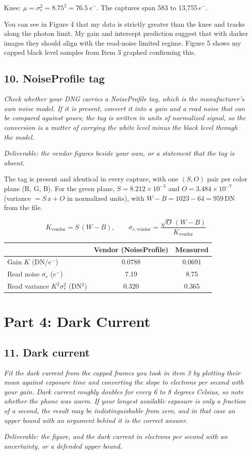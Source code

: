 \documentclass[11pt]{article}
\newcommand{\task}[3]{\subsection*{#1}{\sloppy\noindent\textit{#2}\par}\smallskip\noindent\textit{Deliverable: #3}\par\medskip}
\begin{document}
\noindent Knee: $\mu = \sigma_r^2 = 8.75^2 = 76.5\ e^-$. The captures span 583 to 13{,}755\,$e^-$.

You can see in Figure 4 that my data is strictly greater than the knee and tracks along the photon limit. My gain and intercept prediction suggest that with darker images they should align with the read-noise limited regime.
Figure 5 shows my capped black level samples from Item 3 graphed confirming this.

\task{10. NoiseProfile tag}
{Check whether your DNG carries a NoiseProfile tag, which is the manufacturer's own noise model. If it is present, convert it into a gain and a read noise that can be compared against yours; the tag is written in units of normalized signal, so the conversion is a matter of carrying the white level minus the black level through the model.}
{the vendor figures beside your own, or a statement that the tag is absent.}

\noindent The tag is present and identical in every capture, with one $(S, O)$ pair per color plane (R, G, B). For the green plane, $S = 8.212 \times 10^{-5}$ and $O = 3.484 \times 10^{-7}$ (variance $= S\,x + O$ in normalized units), with $W - B = 1023 - 64 = 959$\,DN from the file.

\[
K_{\text{vendor}} = S\,(W - B), \qquad \sigma_{r,\text{vendor}} = \frac{\sqrt{O}\,(W - B)}{K_{\text{vendor}}}
\]

\begin{center}
\begin{tabular}{lcc}
\toprule
 & Vendor (NoiseProfile) & Measured \\
\midrule
Gain $K$ (DN/$e^-$) & 0.0788 & 0.0691 \\
Read noise $\sigma_r$ ($e^-$) & 7.19 & 8.75 \\
Read variance $K^2\sigma_r^2$ (DN$^2$) & 0.320 & 0.365 \\
\bottomrule
\end{tabular}
\end{center}

\section*{Part 4: Dark Current}

\task{11. Dark current}
{Fit the dark current from the capped frames you took in item 3 by plotting their mean against exposure time and converting the slope to electrons per second with your gain. Dark current roughly doubles for every 6 to 8 degrees Celsius, so note whether the phone was warm. If your longest available exposure is only a fraction of a second, the result may be indistinguishable from zero, and in that case an upper bound with an argument behind it is the correct answer.}
{the figure, and the dark current in electrons per second with an uncertainty, or a defended upper bound.}
\end{document}
